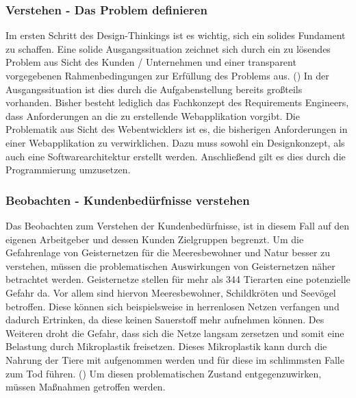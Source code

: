 \documentclass[11pt]{article}
\begin{document}
    \subsubsection{Verstehen - Das Problem definieren}
    Im ersten Schritt des Design-Thinkings ist es wichtig, sich ein solides Fundament zu schaffen.
    Eine solide Ausgangssituation zeichnet sich durch ein zu lösendes Problem aus Sicht des Kunden / Unternehmen und einer transparent vorgegebenen Rahmenbedingungen zur Erfüllung
    des Problems aus. (\cite{design_thinking})
    In der Ausgangssituation ist dies durch die Aufgabenstellung bereits großteils vorhanden. 
    Bisher besteht lediglich das Fachkonzept des Requirements Engineers, dass Anforderungen an die zu erstellende Webapplikation vorgibt.
    Die Problematik aus Sicht des Webentwicklers ist es, die bisherigen Anforderungen in einer Webapplikation zu verwirklichen. Dazu muss sowohl ein Designkonzept, 
    als auch eine Softwarearchitektur erstellt werden. Anschließend gilt es dies durch die Programmierung umzusetzen. 
  
    \subsubsection{Beobachten - Kundenbedürfnisse verstehen}
    Das Beobachten zum Verstehen der Kundenbedürfnisse, ist in diesem Fall auf den eigenen Arbeitgeber und dessen Kunden Zielgruppen begrenzt.
    Um die Gefahrenlage von Geisternetzen für die Meeresbewohner und Natur besser zu verstehen, müssen die problematischen Auswirkungen von 
    Geisternetzen näher betrachtet werden.
    Geisternetze stellen für mehr als 344 Tierarten eine potenzielle Gefahr da. Vor allem sind hiervon Meeresbewohner, Schildkröten
    und Seevögel betroffen. Diese können sich beispielsweise in herrenlosen Netzen verfangen und dadurch Ertrinken, da diese keinen
    Sauerstoff mehr aufnehmen können. Des Weiteren droht die Gefahr, dass sich die Netze langsam zersetzen und somit
    eine Belastung durch Mikroplastik freisetzen. Dieses Mikroplastik kann durch die Nahrung der Tiere mit aufgenommen werden
    und für diese im schlimmsten Falle zum Tod führen. (\cite{wwf_geisternetz})
    Um diesen problematischen Zustand entgegenzuwirken, müssen Maßnahmen getroffen werden.
\end{document}
